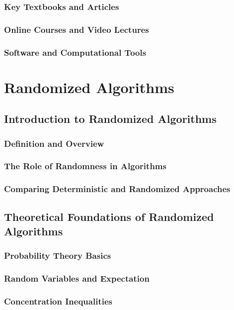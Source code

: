 \documentclass[12pt]{book} %
\begin{document}
\subsection{Key Textbooks and Articles}
\subsection{Online Courses and Video Lectures}
\subsection{Software and Computational Tools}

\chapter{Randomized Algorithms}

\section{Introduction to Randomized Algorithms}
\subsection{Definition and Overview}
\subsection{The Role of Randomness in Algorithms}
\subsection{Comparing Deterministic and Randomized Approaches}

\section{Theoretical Foundations of Randomized Algorithms}
\subsection{Probability Theory Basics}
\subsection{Random Variables and Expectation}
\subsection{Concentration Inequalities}
\end{document}
